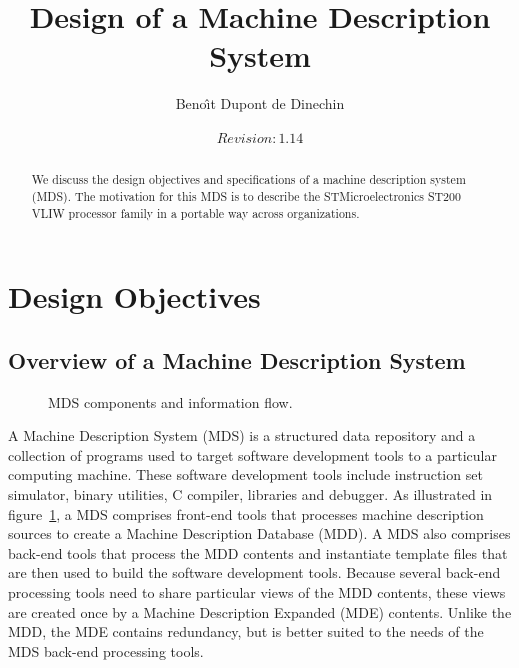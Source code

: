 \documentclass[11pt,a4paper]{article}
\title{Design of a Machine Description System}
\author{Beno\^{\i}t Dupont de Dinechin}
\date{%
$Revision: 1.14 $
}
\begin{document}
\maketitle

\begin{abstract}

We discuss the design objectives and specifications of a machine description
system (MDS). The motivation for this MDS is to describe the STMicroelectronics
ST200 VLIW processor family in a portable way across organizations.

\end{abstract}

\section{Design Objectives}

\subsection{Overview of a Machine Description System}

\begin{figure}
\begin{center}
\end{center}
\caption{MDS components and information flow.}
\label{fig:mds-flow}
\end{figure}

A Machine Description System (MDS) is a structured data repository and a
collection of programs used to target software development tools to a particular
computing machine. These software development tools include instruction set
simulator, binary utilities, C compiler, libraries and debugger. As illustrated
in figure~\ref{fig:mds-flow}, a MDS comprises front-end tools that processes
machine description sources to create a Machine Description Database (MDD). A
MDS also comprises back-end tools that process the MDD contents and instantiate
template files that are then used to build the software development tools.
Because several back-end processing tools need to share particular views of the
MDD contents, these views are created once by a Machine Description Expanded
(MDE) contents. Unlike the MDD, the MDE contains redundancy, but is better suited
to the needs of the MDS back-end processing tools.  \medskip
\end{document}
